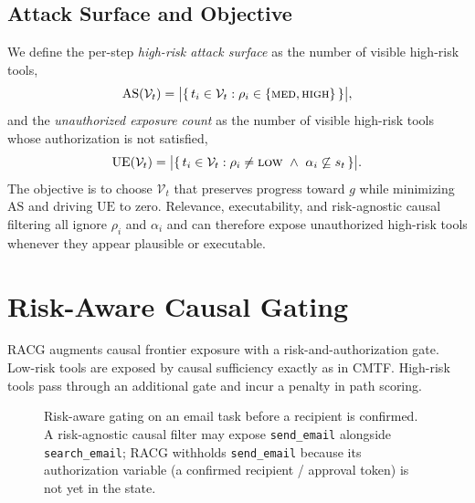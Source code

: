 \documentclass[conference,onecolumn]{IEEEtran}
\begin{document}
\subsection{Attack Surface and Objective}
We define the per-step \emph{high-risk attack surface} as the number of visible high-risk tools,
\begin{equation}
\mathrm{AS}(\mathcal{V}_t) = \big|\{\, t_i \in \mathcal{V}_t : \rho_i \in \{\textsc{med},\textsc{high}\} \,\}\big|,
\end{equation}
and the \emph{unauthorized exposure count} as the number of visible high-risk tools whose authorization is not satisfied,
\begin{equation}
\mathrm{UE}(\mathcal{V}_t) = \big|\{\, t_i \in \mathcal{V}_t : \rho_i \ne \textsc{low} \ \wedge\ \alpha_i \not\subseteq s_t \,\}\big|.
\end{equation}
The objective is to choose $\mathcal{V}_t$ that preserves progress toward $g$ while minimizing $\mathrm{AS}$ and driving $\mathrm{UE}$ to zero. Relevance, executability, and risk-agnostic causal filtering all ignore $\rho_i$ and $\alpha_i$ and can therefore expose unauthorized high-risk tools whenever they appear plausible or executable.

\section{Risk-Aware Causal Gating}
\label{sec:racg}
RACG augments causal frontier exposure with a risk-and-authorization gate. Low-risk tools are exposed by causal sufficiency exactly as in CMTF. High-risk tools pass through an additional gate and incur a penalty in path scoring.

\begin{figure}[t]
    \centering
    \caption{Risk-aware gating on an email task before a recipient is confirmed. A risk-agnostic causal filter may expose \texttt{send\_email} alongside \texttt{search\_email}; RACG withholds \texttt{send\_email} because its authorization variable (a confirmed recipient / approval token) is not yet in the state.}
    \label{fig:gate}
\end{figure}
\end{document}
